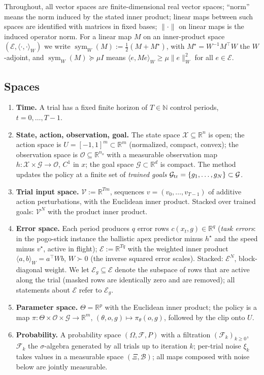 \documentclass[11pt]{article}
\theoremstyle{definition}
\theoremstyle{remark}
\newcommand{\R}{\mathbb{R}}
\newcommand{\N}{\mathbb{N}}
\newcommand{\cV}{\mathcal{V}}
\newcommand{\cE}{\mathcal{E}}
\newcommand{\cG}{\mathcal{G}}
\newcommand{\cX}{\mathcal{X}}
\newcommand{\cO}{\mathcal{O}}
\newcommand{\cF}{\mathcal{F}}
\newcommand{\ip}[2]{\langle #1,#2\rangle_W}
\newcommand{\nW}[1]{\lVert #1\rVert_W}
\newcommand{\n}[1]{\lVert #1\rVert}
\newcommand{\symW}{\operatorname{sym}_W}
\begin{document}
Throughout, all vector spaces are finite-dimensional real vector spaces; ``norm'' means the norm induced by the stated
inner product; linear maps between such spaces are identified with matrices in fixed bases; $\n{\cdot}$ on linear maps
is the induced operator norm. For a linear map $M$ on an inner-product space $(\cE,\ip{\cdot}{\cdot})$ we write
$\symW(M) := \tfrac12(M + M^{\star})$, with $M^\star = W^{-1}M^\top W$ the $W$-adjoint, and $\symW(M)\succeq \mu I$
means $\ip{e}{Me} \ge \mu\nW{e}^2$ for all $e\in\cE$.

\subsection{Spaces}
\begin{enumerate}[label=(S\arabic*),leftmargin=3em]
\item \textbf{Time.} A trial has a fixed finite horizon of $T\in\N$ control periods, $t=0,\dots,T-1$.
\item \textbf{State, action, observation, goal.} The state space $\cX\subseteq\R^{n}$ is open; the action space is
  $U=[-1,1]^m\subset\R^m$ (normalized, compact, convex); the observation space is $\cO\subseteq\R^{n_o}$ with a
  measurable observation map $h:\cX\times\cG\to\cO$, $C^1$ in $x$; the goal space $\cG\subset\R^{d}$ is compact. The
  method updates the policy at a finite set of \emph{trained goals} $\cG_{\rm tr}=\{g_1,\dots,g_N\}\subset\cG$.
\item \textbf{Trial input space.} $\cV:=\R^{Tm}$, sequences $v=(v_0,\dots,v_{T-1})$ of additive action perturbations,
  with the Euclidean inner product. Stacked over trained goals: $\cV^N$ with the product inner product.
\item \textbf{Error space.} Each period produces $q$ error rows $c(x_t,g)\in\R^q$ (\emph{task errors}: in the
  pogo-stick instance the ballistic apex predictor minus $h^\star$ and the speed minus $v^\star$, active in flight);
  $\cE:=\R^{Tq}$ with the weighted inner product $\ip{a}{b}=a^\top W b$, $W\succ 0$ (the inverse squared error scales).
  Stacked: $\cE^N$, block-diagonal weight. We let $\cE_g\subseteq\cE$ denote the subspace of rows that are active along
  the trial (masked rows are identically zero and are removed); all statements about $\cE$ refer to $\cE_g$.
\item \textbf{Parameter space.} $\Theta=\R^p$ with the Euclidean inner product; the policy is a map
  $\pi:\Theta\times\cO\times\cG\to\R^m$, $(\theta,o,g)\mapsto\pi_\theta(o,g)$, followed by the clip onto $U$.
\item \textbf{Probability.} A probability space $(\Omega,\cF,P)$ with a filtration $(\cF_k)_{k\ge0}$, $\cF_k$ the
  $\sigma$-algebra generated by all trials up to iteration $k$; per-trial noise $\xi_k$ takes values in a measurable
  space $(\Xi,\mathcal B)$; all maps composed with noise below are jointly measurable.
\end{enumerate}
\end{document}
